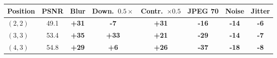 \begin{tabular}{lccccccc}
\toprule
Position & PSNR & Blur & Down.\ $0.5\times$ & Contr.\ $\times0.5$ & JPEG 70 & Noise & Jitter \\
\midrule
$(2,2)$ & 49.1 & \textbf{+31} & \textbf{-7} & \textbf{+31} & \textbf{-16} & \textbf{-14} & \textbf{-6} \\
$(3,3)$ & 53.4 & \textbf{+35} & \textbf{+33} & \textbf{+21} & \textbf{-29} & \textbf{-14} & \textbf{-7} \\
$(4,3)$ & 54.8 & \textbf{+29} & \textbf{+6} & \textbf{+26} & \textbf{-37} & \textbf{-18} & \textbf{-8} \\
\bottomrule
\end{tabular}
